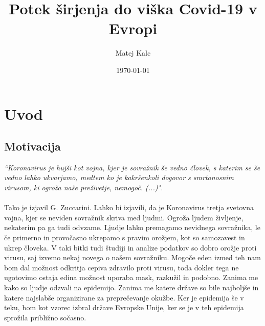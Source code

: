 \documentclass[a4paper,11pt]{article}
\title{Potek širjenja do viška Covid-19 v Evropi}
\author{Matej Kalc} %
\date{\today}
\begin{document}
\maketitle

\section{Uvod}
\subsection{Motivacija}


\emph{“Koronavirus je hujši kot vojna, kjer je sovražnik še vedno človek, s katerim se še
vedno lahko ukvarjamo, medtem ko je kakršenkoli dogovor s smrtonosnim virusom,
ki ogroža naše preživetje, nemogoč. (...)".} \\ \\
Tako je izjavil G. Zuccarini. Lahko bi izjavili, da je Koronavirus tretja svetovna vojna, kjer se neviden sovražnik skriva med ljudmi. Ogroža ljudem življenje, nekaterim pa ga tudi odvzame. Ljudje lahko premagamo nevidnega sovražnika, le če primerno in provočasno ukrepamo s pravim orožjem, kot so samozavest in ukrep človeka. V taki bitki tudi študiji in analize podatkov so dobro orožje proti virusu, saj izvemo nekaj novega o našem sovražniku. Mogoče eden izmed teh nam bom dal možnost odkritja cepiva zdravilo proti virusu, toda dokler tega ne ugotovimo ostaja edina možnost uporaba mask, razkužil in podobno. Zanima me kako so ljudje odzvali na epidemijo. Zanima me katere države so bile najboljše in katere najslabše organizirane za preprečevanje okužbe. Ker je epidemija še v teku, bom kot vzorec izbral države Evropske Unije, ker se je v teh epidemija sprožila približno sočasno. 
\end{document}
